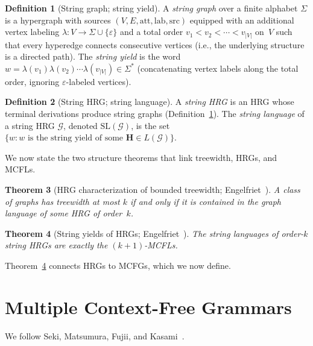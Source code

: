 \documentclass[11pt,a4paper]{article}
\theoremstyle{plain}
\newtheorem{theorem}{Theorem}[section]
\theoremstyle{definition}
\newtheorem{definition}[theorem]{Definition}
\theoremstyle{remark}
\begin{document}
\begin{definition}[String graph; string yield]\label{def:string-graph}
A \emph{string graph} over a finite alphabet $\Sigma$ is a hypergraph with sources $(V, E, \mathrm{att}, \mathrm{lab}, \mathrm{src})$ equipped with an additional vertex labeling $\lambda\colon V \to \Sigma \cup \{\varepsilon\}$ and a total order $v_1 < v_2 < \cdots < v_{|V|}$ on~$V$ such that
every hyperedge connects consecutive vertices (i.e., the underlying structure is a directed path).
The \emph{string yield} is the word $w = \lambda(v_1)\lambda(v_2) \cdots \lambda(v_{|V|}) \in \Sigma^*$ (concatenating vertex labels along the total order, ignoring $\varepsilon$-labeled vertices).
\end{definition}

\begin{definition}[String HRG; string language]\label{def:string-hrg}
A \emph{string HRG} is an HRG whose terminal derivations produce string graphs (Definition~\ref{def:string-graph}).
The \emph{string language} of a string HRG $\mathcal{G}$, denoted $\mathrm{SL}(\mathcal{G})$, is the set $\{w : w \text{ is the string yield of some } \mathbf{H} \in L(\mathcal{G})\}$.
\end{definition}

We now state the two structure theorems that link treewidth, HRGs, and MCFLs.

\begin{theorem}[HRG characterization of bounded treewidth; Engelfriet~\cite{Engelfriet97}]\label{thm:hrg-tw}
A class of graphs has treewidth at most $k$ if and only if it is contained in the graph language of some HRG of order~$k$.
\end{theorem}

\begin{theorem}[String yields of HRGs; Engelfriet~\cite{Engelfriet97}]\label{thm:hrg-mcfl}
The string languages of order-$k$ string HRGs are exactly the $(k{+}1)$-MCFLs.
\end{theorem}

Theorem~\ref{thm:hrg-mcfl} connects HRGs to MCFGs, which we now define.

\section{Multiple Context-Free Grammars}\label{sec:mcfg}

We follow Seki, Matsumura, Fujii, and Kasami~\cite{Seki91}.
\end{document}
